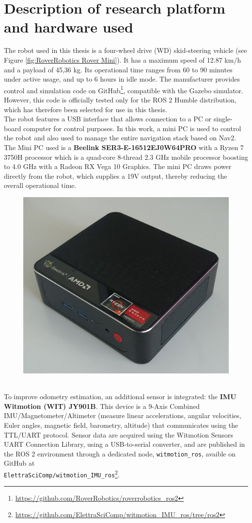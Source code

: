 \chapter{Description of research platform and hardware used}
The robot used in this thesis is a four-wheel drive (WD) skid-steering vehicle (see Figure \ref{fig:RoverRobotics Rover Mini}). It has a maximum speed of 12.87 km/h and a payload of 45,36 kg. Its operational time ranges from 60 to 90 minutes under active usage, and up to 6 hours in idle mode. The manufacturer provides control and simulation code on GitHub\footnote{\href{https://github.com/RoverRobotics/roverrobotics_ros2}{https://github.com/RoverRobotics/roverrobotics\_ros2}}, compatible with the Gazebo simulator. However, this code is officially tested only for the ROS 2 Humble distribution, which has therefore been selected for use in this thesis.\\
The robot features a USB interface that allows connection to a PC or single-board computer for control purposes. In this work, a mini PC is used to control the robot and also used to manage the entire navigation stack based on Nav2.
The Mini PC used is a \textbf{Beelink SER3-E-16512EJ0W64PRO} with a Ryzen 7 3750H processor which is a quad-core 8-thread 2.3 GHz mobile processor boosting to 4.0 GHz with a Radeon RX Vega 10 Graphics.
The mini PC draws power directly from the robot, which supplies a 19V output, thereby reducing the overall operational time.
\begin{figure}[h]
	\centering
	\includegraphics[width=0.4\linewidth]{img/miniPC.jpg}
\end{figure}\\
To improve odometry estimation, an additional sensor is integrated: the \textbf{IMU Witmotion (WIT) JY901B}. This device is a 9-Axis Combined IMU/Magnetometer/Altimeter (measure linear accelerations, angular velocities, Euler angles, magnetic field, barometry, altitude) that communicates using the TTL/UART protocol. Sensor data are acquired using the Witmotion Sensors UART Connection Library\cite{andrei_vukolov_2022_7017118}, using a USB-to-serial converter, and are published in the ROS 2 environment through a dedicated node, \texttt{witmotion\_ros}, avaible on GitHub at \\ \texttt{ElettraSciComp/witmotion\_IMU\_ros}\footnote{\href{https://github.com/ElettraSciComp/witmotion_IMU_ros/tree/ros2}{https://github.com/ElettraSciComp/witmotion\_IMU\_ros/tree/ros2}}.
